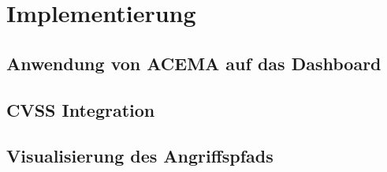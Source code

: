 \chapter{Implementierung}
\label{chap:implementierung}
\section[Anwendung von ACEMA]{Anwendung von ACEMA auf das Dashboard}
\label{sec:anwendungVonAcema}
\section{CVSS Integration}
\label{sec:cvssIntegration}
\section{Visualisierung des Angriffspfads}
\label{sec:visualisierungDesAngriffspfads}